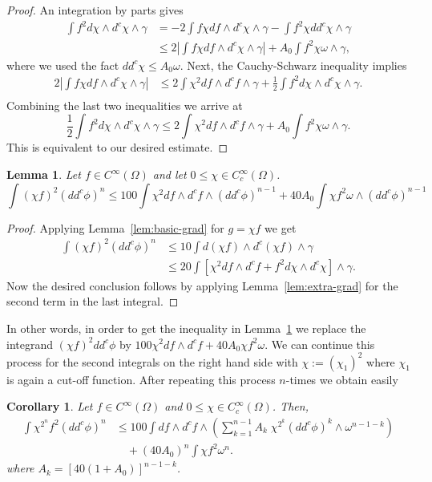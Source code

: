 \documentclass{amsart}
\newcommand{\ga}{\gamma}
\newcommand{\om}{\omega}
\newcommand{\Om}{\Omega}
\newtheorem{lem}[thm]{Lemma}
\newtheorem{cor}[thm]{Corollary}
\theoremstyle{definition}
\numberwithin{thm}{section}
\numberwithin{equation}{section}
\renewcommand{\[}{\begin{equation}}
\renewcommand{\]}{\end{equation}}
\newcommand{\wed}{\wedge}
\begin{document}
\begin{proof} An integration by parts gives
$$\begin{aligned}
	\int f^2 d\chi \wed d^c\chi \wed\ga &= -2 \int f \chi df\wed d^c\chi \wed\ga - \int f^2 \chi dd^c\chi \wed \ga\\
&\leq		2 \left| \int f \chi df\wed d^c\chi \wed\ga \right| + A_0 \int f^2  \chi \om \wed\ga,
\end{aligned}$$
where we used the fact $dd^c \chi \leq A_0\om$.
Next, the  Cauchy-Schwarz inequality implies 
$$\begin{aligned}
2\left| \int f \chi df\wed d^c\chi \wed\ga \right|  &\leq 2 \int \chi^2 df \wed d^c f \wed \ga + \frac{1}{2}\int f^2 d\chi \wed d^c \chi \wed\ga. \\
\end{aligned}$$
Combining the last two inequalities we arrive at
$$
	\frac{1}{2}\int f^2 d\chi \wed d^c \chi \wed \ga   \leq  2 \int \chi^2 d f\wed d^c f\wed \ga + A_0 \int f^2  \chi \om \wed\ga.
$$
This is equivalent to our desired estimate.
\end{proof}


\begin{lem} \label{lem:L2-cap-grad} Let $f\in C^\infty(\Om)$ and let $0\leq \chi \in C^\infty_c(\Om)$. 
$$
	\int (\chi f)^2 (dd^c \phi)^n \leq  100 \int \chi^2 df \wed d^c f\wed (dd^c\phi)^{n-1} + 40A_0 \int \chi f^2 \om \wed (dd^c\phi)^{n-1}
$$
\end{lem}

\begin{proof} Applying Lemma~\ref{lem:basic-grad} for $g = \chi f$ we get
$$\begin{aligned}
	\int (\chi f)^2 (dd^c\phi)^n 
&\leq 10 \int d(\chi f) \wed d^c(\chi f) \wed \ga \\
&\leq 20 \int [ \chi^2 df \wed d^c f + f^2 d\chi \wed d^c \chi] \wed \ga.
\end{aligned}$$
Now the desired conclusion follows by applying Lemma~\ref{lem:extra-grad} for the second term in the last integral.
\end{proof}

In other words, in order to get the inequality in Lemma~\ref{lem:L2-cap-grad} we  replace the integrand $(\chi f)^2 dd^c\phi$ by $100\chi^2 df \wed d^c f + 40A_0 \chi f^2 \om$.
We can continue this process  for the second integrals on the right hand side with $
\chi := (\chi_1)^2$ where $\chi_1$ is again a cut-off function. After repeating this process $n$-times we obtain easily 

\begin{cor}\label{cor:L2-cap-grad}  Let $f\in C^\infty(\Om)$ and $0\leq \chi \in C^\infty_c(\Om)$. Then,
$$\begin{aligned}
	\int \chi^{2^{n}} f^2 (dd^c\phi)^n &\leq 100 \int df \wed d^c f \wed \left( \sum_{k=1}^{n-1} A_k \;\chi^{2^{k}}  (dd^c \phi)^{k} \wed \om^{n-1-k} \right) \\ &\quad + (40A_0)^n \int \chi f^2 \om^n.
\end{aligned}$$
where $A_k =[40(1+ A_0)]^{n-1-k}$.
\end{cor}
\end{document}

